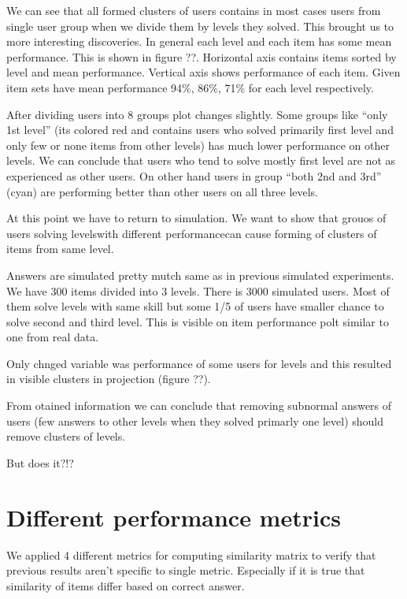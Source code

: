 \documentclass[
  digital, %
  table,   %
  nolof,     %
  nolot,     %
  nocover
]{fithesis3}
\begin{document}
We can see that all formed clusters of users contains in most cases users
from single user group when we divide them by levels they solved. This
brought us to more interesting discoveries. In general each level and
each item has some mean performance. This is shown in figure ??.
Horizontal axis contains items sorted by level and mean performance.
Vertical axis shows performance of each item. Given item sets have mean
performance 94\%, 86\%, 71\% for each level respectively.

After dividing users into 8 groups plot changes slightly. Some groups
like ``only 1st level'' (its colored red and contains users who solved
primarily first level and only few or none items from other levels) has
much lower performance on other levels. We can conclude that users who
tend to solve mostly first level are not as experienced as other users. On
other hand users in group ``both 2nd and 3rd'' (cyan) are performing
better than other users on all three levels.

At this point we have to return to simulation. We want to show that
grouos of users solving levelswith different performancecan cause
forming of clusters of items from same level.

Answers are simulated pretty mutch same as in previous simulated
experiments. We have 300 items divided into 3 levels. There is 3000
simulated users. Most of them solve levels with same skill but some 1/5
of users have smaller chance to solve second and third level. This is
visible on item performance polt similar to one from real data.

Only chnged variable was performance of some users for levels and this
resulted in visible clusters in projection (figure ??).

From otained information we can conclude that removing subnormal answers
of users (few answers to other levels when they solved primarly one
level) should remove clusters of levels.

But does it?!?

\section{Different performance
metrics}\label{different-performance-metrics}


We applied 4 different metrics for computing similarity matrix to verify
that previous results aren't specific to single metric. Especially if it
is true that similarity of items differ based on correct answer.
\end{document}
